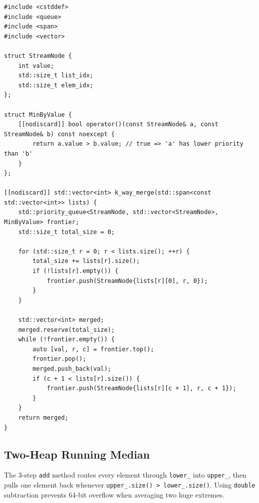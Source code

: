 \documentclass[11pt,a4paper]{article}
\theoremstyle{definition}
\begin{document}
\begin{lstlisting}[caption={$K$-way merge of sorted vectors in $O(N \log K)$ time and $O(K)$ auxiliary space.}]
#include <cstddef>
#include <queue>
#include <span>
#include <vector>

struct StreamNode {
    int value;
    std::size_t list_idx;
    std::size_t elem_idx;
};

struct MinByValue {
    [[nodiscard]] bool operator()(const StreamNode& a, const StreamNode& b) const noexcept {
        return a.value > b.value; // true => 'a' has lower priority than 'b'
    }
};

[[nodiscard]] std::vector<int> k_way_merge(std::span<const std::vector<int>> lists) {
    std::priority_queue<StreamNode, std::vector<StreamNode>, MinByValue> frontier;
    std::size_t total_size = 0;

    for (std::size_t r = 0; r < lists.size(); ++r) {
        total_size += lists[r].size();
        if (!lists[r].empty()) {
            frontier.push(StreamNode{lists[r][0], r, 0});
        }
    }

    std::vector<int> merged;
    merged.reserve(total_size);
    while (!frontier.empty()) {
        auto [val, r, c] = frontier.top();
        frontier.pop();
        merged.push_back(val);
        if (c + 1 < lists[r].size()) {
            frontier.push(StreamNode{lists[r][c + 1], r, c + 1});
        }
    }
    return merged;
}
\end{lstlisting}

\subsection{Two-Heap Running Median}

The 3-step \texttt{add} method routes every element through \texttt{lower\_} into \texttt{upper\_}, then pulls one element back whenever \texttt{upper\_.size() > lower\_.size()}. Using \texttt{double} subtraction prevents 64-bit overflow when averaging two huge extremes.
\end{document}
